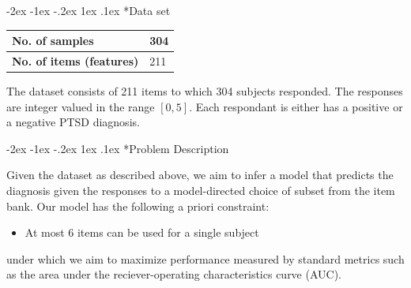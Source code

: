 \documentclass[twocolumn,,9pt]{IEEEtran}
\makeatletter
\renewcommand\section{\@startsection {section}{1}{\z@}%
  {-2ex \@plus -1ex \@minus -.2ex}%
  {1ex \@plus.1ex}%
  {\large\bfseries\scshape}}
\makeatother
\begin{document}
 
% 
% 
\vspace{-10pt}   


\section*{Data set}

\begin{table}[!ht]
  \begin{tabular}{|L{1.5in}|L{.3in}|}\hline
    \bf \sffamily No. of samples & 304 \\\hline
    \bf \sffamily No. of items (features) & 211 \\\hline
  \end{tabular}
\end{table}

The dataset consists of 211 items to which 304
subjects responded. The responses are integer valued in the range $[0,5]$.
  Each respondant is either has a positive or a negative
  PTSD diagnosis.

\section*{Problem Description}

Given the dataset as described above, we aim to infer a
model that predicts the diagnosis given the responses
to a model-directed choice of subset from the  item bank.
Our model has the following a priori constraint:
\begin{itemize}
\item At most $6$ items can be used for a single subject
\end{itemize}
under which we aim to maximize performance measured by standard
metrics such as the area under the reciever-operating characteristics curve (AUC).
\end{document}
